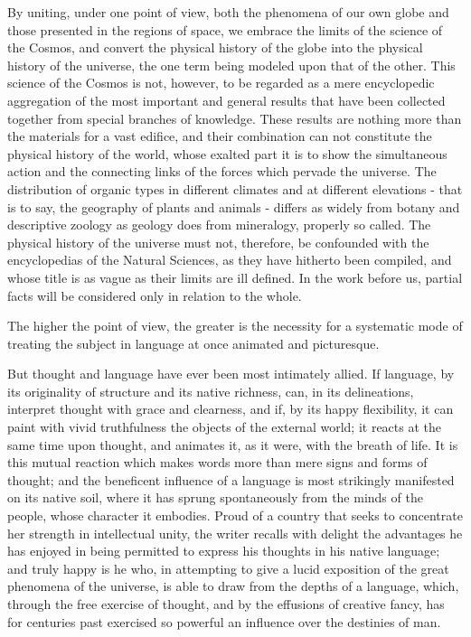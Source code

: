 By uniting, under one point of view, both the phenomena of our own globe and those presented in the regions of space, we embrace the limits of the science of the Cosmos, and convert the physical history of the globe into the physical history of the universe, the one term being modeled upon that of the other. This science of the Cosmos is not, however, to be regarded as a mere encyclopedic aggregation of the most important and general results that have been collected together from special branches of knowledge. These results are nothing more than the materials for a vast edifice, and their combination can not constitute the physical history of the world, whose exalted part it is to show the simultaneous action and the connecting links of the forces which pervade the universe. The distribution of organic types in different climates and at different elevations - that is to say, the geography of plants and animals - differs as widely from botany and descriptive zoology as geology does from mineralogy, properly so called. The physical history of the universe must not, therefore, be confounded with the encyclopedias of the Natural Sciences, as they have hitherto been compiled, and whose title is as vague as their limits are ill defined. In the work before us, partial facts will be considered only in relation to the whole.

The higher the point of view, the greater is the necessity for a systematic mode of treating the subject in language at once animated and picturesque.

But thought and language have ever been most intimately allied. If language, by its originality of structure and its native richness, can, in its delineations, interpret thought with grace and clearness, and if, by its happy flexibility, it can paint with vivid truthfulness the objects of the external world; it reacts at the same time upon thought, and animates it, as it were, with the breath of life. It is this mutual reaction which makes words more than mere signs and forms of thought; and the beneficent influence of a language is most strikingly manifested on its native soil, where it has sprung spontaneously from the minds of the people, whose character it embodies. Proud of a country that seeks to concentrate her strength in intellectual unity, the writer recalls with delight the advantages he has enjoyed in being permitted to express his thoughts in his native language; and truly happy is he who, in attempting to give a lucid exposition of the great phenomena of the universe, is able to draw from the depths of a language, which, through the free exercise of thought, and by the effusions of creative fancy, has for centuries past exercised so powerful an influence over the destinies of man.

